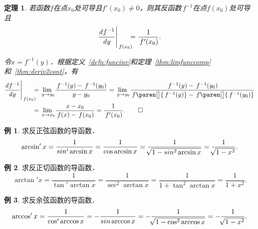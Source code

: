 \documentclass[a4paper,punct=CCT]{ctexbook}
\makeatletter
\newtheorem{theorem}{定理}
\theoremstyle{definition}
\newtheorem*{example*}{例}
\theoremstyle{remark}
\renewcommand*{\proofname}{证}
\renewenvironment{proof}[1][\proofname]{\par
  \pushQED{\qed}%
  \normalfont \topsep6\p@\@plus6\p@\relax
  \trivlist
  \item[\hskip\labelsep
    \bfseries
    #1%
    ]\ignorespaces
}{%
  \popQED\endtrivlist\@endpefalse
}
\makeatother
\begin{document}
\begin{theorem}
  \label{thm:derivinv}
  若函数\(f\)在点\(x_0\)处可导且\(f'(x_0) \ne 0\)，则其反函数\(\,f^{-1}\)在点\(f(x_0)\)处可导且
  \begin{equation*}
    \dd[f^{-1}]y \Bigg\vert_{\,f(x_0)} \mkern-11mu = \frac1{\,f'(x_0)}.
  \end{equation*}

  \begin{proof}
    令\(x = f^{-1}(y)\)．根据定义~\ref{defn:funcinv}和定理~\ref{thm:limfunccomp}和~\ref{thm:deriv2cont}，有
    \begin{equation*}
      \begin{split}
        \dd[f^{-1}]y \Bigg\vert_{\,f(x_0)} \mkern-11mu
        &= \lim_{\,y\to y_0\!} \frac{\,f^{-1}(y) - \,f^{-1}(y_0)}{y - y_0}
        = \lim_{\,y\to y_0\!} \frac{\,f^{-1}(y) - \,f^{-1}(y_0)}{\,f\paren[\big]{\,f^{-1}(y)} - \,f\paren[\big]{\,f^{-1}(y_0)}} \\
        &= \lim_{\,x\to x_0\!} \frac{x - x_0}{\,f(x) - \,f(x_0)}
        = \frac{1}{\,f'(x_0)}.
        \qedhere
      \end{split}
    \end{equation*}
  \end{proof}
\end{theorem}

\begin{example*}
  求反正弦函数的导函数．
  \begin{equation*}
    \arcsin'x
    = \frac1{\sin'\arcsin x}
    = \frac1{\cos\arcsin x}
    = \frac1{\negthickspace\sqrt{1 - \sin^2\arcsin x}}
    = \frac1{\negthickspace\sqrt{1 - x^2}}.
  \end{equation*}
\end{example*}

\begin{example*}
  求反正切函数的导函数．
  \begin{equation*}
    \arctan'x
    = \frac1{\tan'\arctan x}
    = \frac1{\sec^2\arctan x}
    = \frac1{1 + \tan^2\arctan x}
    = \frac1{1 + x^2}.
  \end{equation*}
\end{example*}

\begin{example*}
  求反余弦函数的导函数．
  \begin{equation*}
    \arccos'x
    = \frac1{\cos'\arccos x}
    = - \frac1{\sin\arccos x}
    = - \frac1{\negthickspace\sqrt{1 - \cos^2\arccos x}}
    = - \frac1{\negthickspace\sqrt{1 - x^2}}.
  \end{equation*}
\end{example*}
\end{document}
